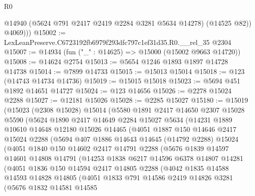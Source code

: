\begin{lexlean}{R0}
\begin{coremodule}
            @14940
            (@5624 @791 @2417 @2419 @2284 @3281 @5634 @14278)
            (@14525 @82))
          @4069)))
@15002 := LexLeanPreserve.C6723192fb6979f293dfc797c1ef31d35.R0.__rel_35 @2304
@15007 := @14934 (fun ("_" : @14625) => @15000 (@15002 @9663 @14720))
@15008 := @14624 @2754
@15013 := @5654 @1246 @1893 @1897 @14728 @14738
@15014 := @7899 @14733
@15015 := @15013 @15014
@15018 := @123 (@14743 @14734 @14736)
@15019 := @15015 @15018
@15023 := @5694 @451 @1892 @14651 @14727
@15024 := @123 @14656
@15026 := @2278 @15024 @2288
@15027 := @12181 @15026
@15028 := @2285 @15027
@15180 := @15019
    (@15023
      (@2308 @15028)
      @15014
      (@5580
        @1891
        @2417
        @14650
        @2307
        @15028
        @5590
        (@5624
          @1890
          @2417
          @14649
          @2284
          @15027
          @5634
          (@14231
            @1889
            @10610
            @14648
            @12180
            @15026
            @14465
            (@4051
              @1887
              @150
              @14646
              @2417
              @15024
              @2288
              (@5694
                @407
                @1886
                @14643
                @14645
                (@14792 @2288)
                @15024
                (@4051
                  @1840
                  @150
                  @14602
                  @2417
                  @14791
                  @2288
                  (@5676
                    @1839
                    @14597
                    @14601
                    @14808
                    @14791
                    (@14253
                      @1838
                      @6217
                      @14596
                      @6378
                      @14807
                      @14281
                      (@4051
                        @1836
                        @150
                        @14594
                        @2417
                        @14805
                        @2288
                        (@4042
                          @1835
                          @14588
                          @14593
                          @14828
                          @14805
                          (@4051
                            @1833
                            @791
                            @14586
                            @2419
                            @14826
                            @3281
                            (@5676
                              @1832
                              @14581
                              @14585

\end{coremodule}
\end{lexlean}
